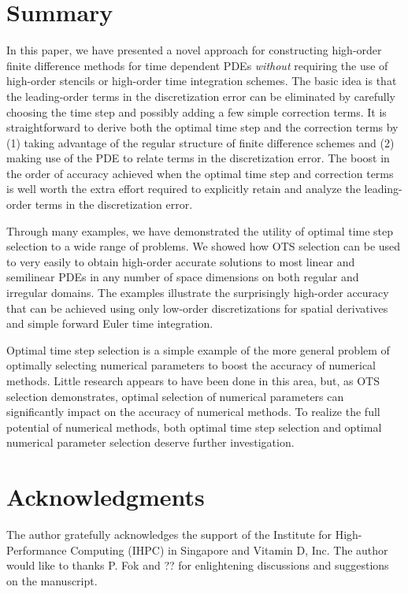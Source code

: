 \documentclass[oneeqnum,onefignum,onetabnum,onethmnum]{siamltex}
\begin{document}
\section{\label{sec:summary} Summary} 
In this paper, we have presented a novel approach for constructing high-order
finite difference methods for time dependent PDEs \emph{without} requiring
the use of high-order stencils or high-order time integration schemes.  
The basic idea is that the leading-order terms in the discretization error
can be eliminated by carefully choosing the time step and possibly adding
a few simple correction terms.  It is straightforward to derive both the 
optimal time step and the correction terms by (1) taking advantage of the 
regular structure of finite difference schemes and (2) making use of the
PDE to relate terms in the discretization error.  The boost in the order
of accuracy achieved when the optimal time step and correction terms is well
worth the extra effort required to explicitly retain and analyze the 
leading-order terms in the discretization error.   

Through many examples, we have demonstrated the utility of optimal time step
selection to a wide range of problems.  We showed how OTS selection can be 
used to very easily to obtain high-order accurate solutions to most linear 
and semilinear PDEs in any number of space dimensions on both regular
and irregular domains.  The examples illustrate the surprisingly high-order
accuracy that can be achieved using only low-order discretizations for 
spatial derivatives and simple forward Euler time integration.

Optimal time step selection is a simple example of the more general problem
of optimally selecting numerical parameters to boost the accuracy of 
numerical methods.  Little research appears to have been done in this area,
but, as OTS selection demonstrates, optimal selection of numerical parameters 
can significantly impact on the accuracy of numerical methods.  To realize
the full potential of numerical methods, both optimal time step selection 
and optimal numerical parameter selection deserve further investigation.


\section*{Acknowledgments}
The author gratefully acknowledges the support of the Institute for 
High-Performance Computing (IHPC) in Singapore and Vitamin D, Inc.
The author would like to thanks P. Fok and ?? for enlightening discussions 
and suggestions on the manuscript.


\end{document}
